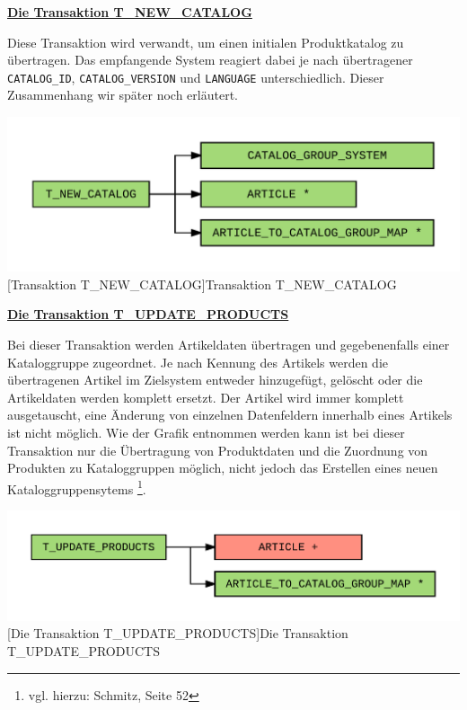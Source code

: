 	
	
	\textbf{\underline{Die Transaktion T\_NEW\_CATALOG}}
	
	Diese Transaktion wird verwandt, um einen initialen Produktkatalog zu übertragen. Das empfangende System reagiert dabei je nach übertragener \texttt{CATALOG\_ID}, \texttt{CATALOG\_VERSION}
	und \texttt{LANGUAGE} unterschiedlich. Dieser Zusammenhang wir später noch erläutert. %
	
	
	\begin{minipage}{\linewidth}
		\vspace{1em}
		\centering
		\includegraphics[width=0.65\linewidth]{img/newCatalog}
		[Transaktion T\_NEW\_CATALOG]{Transaktion T\_NEW\_CATALOG}
		\label{fig:header}
		\vspace{1em}
	\end{minipage}
	
	\textbf{\underline{Die Transaktion T\_UPDATE\_PRODUCTS}}
	
	Bei dieser Transaktion werden Artikeldaten übertragen und gegebenenfalls einer Kataloggruppe zugeordnet. Je nach Kennung des Artikels werden die übertragenen
	Artikel im Zielsystem entweder hinzugefügt, gelöscht oder die Artikeldaten werden komplett ersetzt.
	Der Artikel wird immer komplett ausgetauscht, eine Änderung von einzelnen Datenfeldern innerhalb eines Artikels ist nicht möglich.
	Wie der Grafik entnommen werden kann ist bei dieser Transaktion nur die Übertragung von Produktdaten und die Zuordnung von Produkten zu Kataloggruppen möglich, nicht jedoch das Erstellen eines neuen Kataloggruppensytems \footnote{vgl. hierzu: Schmitz, Seite 52}.
	
	\begin{minipage}{\linewidth}
		\vspace{1em}
		\centering
		\includegraphics[width=0.65\linewidth]{img/updateProducts}
		[Die Transaktion T\_UPDATE\_PRODUCTS]{Die Transaktion T\_UPDATE\_PRODUCTS}
		\label{fig:header}
		\vspace{1em}
	\end{minipage}
	
